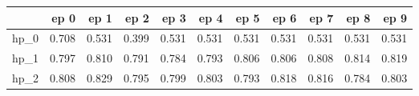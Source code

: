 \begin{tabular}{lrrrrrrrrrr}
\toprule
{} &   ep 0 &   ep 1 &   ep 2 &   ep 3 &   ep 4 &   ep 5 &   ep 6 &   ep 7 &   ep 8 &   ep 9 \\
\midrule
hp\_0 &  0.708 &  0.531 &  0.399 &  0.531 &  0.531 &  0.531 &  0.531 &  0.531 &  0.531 &  0.531 \\
hp\_1 &  0.797 &  0.810 &  0.791 &  0.784 &  0.793 &  0.806 &  0.806 &  0.808 &  0.814 &  0.819 \\
hp\_2 &  0.808 &  0.829 &  0.795 &  0.799 &  0.803 &  0.793 &  0.818 &  0.816 &  0.784 &  0.803 \\
\bottomrule
\end{tabular}

